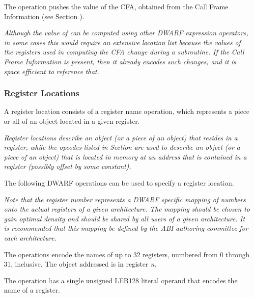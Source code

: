 \begin{enumerate}[1. ]
\itembfnl{\DWOPcallframecfaTARG}
The \DWOPcallframecfaNAME{} operation pushes the value of the CFA,
obtained from the Call Frame Information (see Section
).

\textit{Although the value of \DWATframebase{} can be computed using
other DWARF expression operators, in some cases this would require
an extensive location list because the values of the registers used
in computing the CFA change during a subroutine. If the Call Frame
Information is present, then it already encodes such changes, and it
is space efficient to reference that.}
\end{enumerate}

\subsubsection{Register Locations}
\label{chap:registerlocations}
A register location consists of a register name operation, which
represents a piece or all of an object located in a given register.

\textit{Register locations describe an object
(or a piece of an object) that resides in a register, while
the opcodes listed in
Section 
are used to describe an object (or a piece of
an object) that is located in memory at an address that is
contained in a register (possibly offset by some constant).}

The following DWARF operations can be used to
specify a register location.

\textit{Note that the register number represents a DWARF specific
mapping of numbers onto the actual registers of a given
architecture. The mapping should be chosen to gain optimal
density and should be shared by all users of a given
architecture. It is recommended that this mapping be defined
by the ABI authoring committee for each architecture.}

\begin{enumerate}[1. ]
The \DWOPregnTARG{} operations encode the names of up to 32
registers, numbered from 0 through 31, inclusive. The object
addressed is in register \textit{n}.

\itembfnl{\DWOPregxTARG}
The \DWOPregxNAME{} operation has a single
unsigned LEB128 literal
operand that encodes the name of a register.

\end{enumerate}

